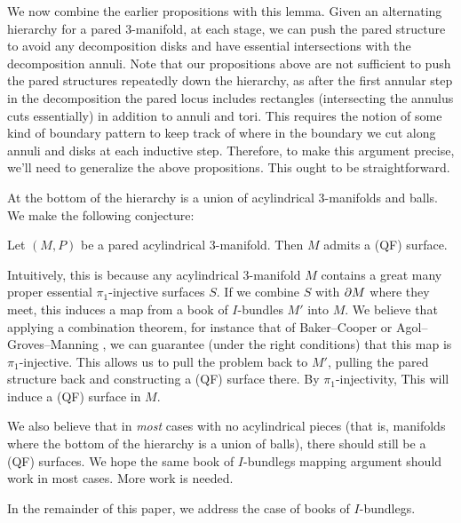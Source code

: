 We now combine the earlier propositions with this lemma. Given an alternating
hierarchy for a pared 3-manifold, at each stage, we can push the pared
structure to avoid any decomposition disks and have essential intersections
with the decomposition annuli. Note that our propositions above are not
sufficient to push the pared structures repeatedly down the hierarchy, as after
the first annular step in the decomposition the pared locus includes rectangles
(intersecting the annulus cuts essentially) in addition to annuli and tori.
This requires the notion of some kind of boundary pattern to keep track of
where in the boundary we cut along annuli and disks at each inductive step.
Therefore, to make this argument precise, we'll need to generalize the above
propositions. This ought to be straightforward.

At the bottom of the hierarchy is a union of acylindrical 3-manifolds and
balls. We make the following conjecture:

\begin{conj}

Let $(M,P)$ be a pared acylindrical 3-manifold. Then $M$ admits a (QF) surface.

\end{conj}

Intuitively, this is because any acylindrical 3-manifold $M$ contains a great
many proper essential $\pi_1$-injective surfaces $S$. If we combine $S$ with
$\partial M$ where they meet, this induces a map from a book of $I$-bundles $M'$
into $M$. We believe that applying a combination theorem, for instance that of
Baker--Cooper \cite{BCcombination} or Agol--Groves--Manning
\cite{AGMcombination}, we can guarantee (under the right conditions) that this
map is $\pi_1$-injective. This allows us to pull the problem back to $M'$,
pulling the pared structure back and constructing a (QF) surface there. By
$\pi_1$-injectivity, This will induce a (QF) surface in $M$.

We also believe that in \emph{most} cases with no acylindrical pieces (that is,
manifolds where the bottom of the hierarchy is a union of balls), there should
still be a (QF) surfaces. We hope the same book of $I$-bundlegs mapping
argument should work in most cases. More work is needed.

In the remainder of this paper, we address the case of books of $I$-bundlegs.
